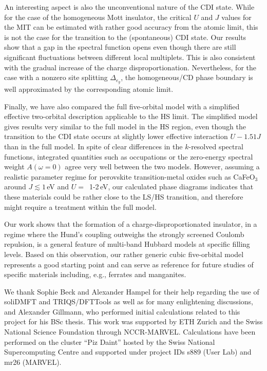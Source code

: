 \documentclass[aps,prb,twocolumn,superscriptaddress,10pt]{revtex4-1}
\begin{document}
An interesting aspect is also the unconventional nature of the CDI state. While for the case of the homogeneous Mott insulator, the critical $U$ and $J$ values for the MIT can be estimated with rather good accuracy from the atomic limit, this is not the case for the transition to the (spontaneous) CDI state. 
Our results show that a gap in the spectral function opens even though there are still significant fluctuations between different local multiplets. This is also consistent with the gradual increase of the charge disproportionation. Nevertheless, for the case with a nonzero site splitting $\Delta_{e_g}$, the homogeneous/CD phase boundary is well approximated by the corresponding atomic limit. 

Finally, we have also compared the full five-orbital model with a simplified effective two-orbital description applicable to the HS limit. The simplified model gives results very similar to the full model in the HS region, even though the transition to the CDI state occurs at slightly lower effective interaction $U - 1.51 J$ than in the full model. In spite of clear differences in the $k$-resolved spectral functions, integrated quantities such as occupations or the zero-energy spectral weight $A(\omega=0)$ agree very well between the two models.
However, assuming a realistic parameter regime for perovskite transition-metal oxides such as CaFeO$_3$ around $J\lesssim 1$\,eV and $U=$\ 1-2\,eV, our calculated phase diagrams indicates that these materials could be rather close to the LS/HS transition, and therefore might require a treatment within the full model.

Our work shows that the formation of a charge-disproportionated insulator, in a regime where the Hund's coupling outweighs the strongly screened Coulomb repulsion, is a general feature of multi-band Hubbard models at specific filling levels. Based on this observation, our rather generic cubic five-orbital model represents a good starting point and can serve as reference for future studies of specific materials including, e.g., ferrates and manganites.

\appendix*
\begin{acknowledgments}
We thank Sophie Beck and Alexander Hampel for their help regarding the use of soliDMFT and TRIQS/DFTTools as well as for many enlightening discussions, and Alexander Gillmann, who performed initial calculations related to this project for his BSc thesis.
This work was supported by ETH Zurich and the Swiss National Science Foundation through NCCR-MARVEL. Calculations have been performed on the cluster ``Piz Daint'' hosted by the Swiss National Supercomputing Centre and supported under project IDs s889 (User Lab) and
mr26 (MARVEL).
\end{acknowledgments}
\end{document}
